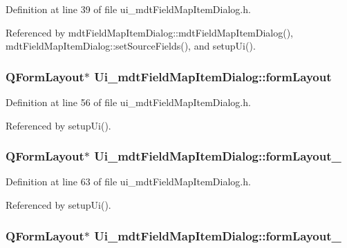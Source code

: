 Definition at line 39 of file ui\-\_\-mdt\-Field\-Map\-Item\-Dialog.\-h.



Referenced by mdt\-Field\-Map\-Item\-Dialog\-::mdt\-Field\-Map\-Item\-Dialog(), mdt\-Field\-Map\-Item\-Dialog\-::set\-Source\-Fields(), and setup\-Ui().

\hypertarget{class_ui__mdt_field_map_item_dialog_a70b660e5e042b03908d013fef4bb9437}{
\subsubsection[{form\-Layout}]{\setlength{\rightskip}{0pt plus 5cm}Q\-Form\-Layout$\ast$ Ui\-\_\-mdt\-Field\-Map\-Item\-Dialog\-::form\-Layout}}\label{class_ui__mdt_field_map_item_dialog_a70b660e5e042b03908d013fef4bb9437}


Definition at line 56 of file ui\-\_\-mdt\-Field\-Map\-Item\-Dialog.\-h.



Referenced by setup\-Ui().

\hypertarget{class_ui__mdt_field_map_item_dialog_a010f84c75b657df551a246d9578ce88a}{
\subsubsection[{form\-Layout\-\_\-2}]{\setlength{\rightskip}{0pt plus 5cm}Q\-Form\-Layout$\ast$ Ui\-\_\-mdt\-Field\-Map\-Item\-Dialog\-::form\-Layout\-\_}}\label{class_ui__mdt_field_map_item_dialog_a010f84c75b657df551a246d9578ce88a}


Definition at line 63 of file ui\-\_\-mdt\-Field\-Map\-Item\-Dialog.\-h.



Referenced by setup\-Ui().

\hypertarget{class_ui__mdt_field_map_item_dialog_aeed0e8395f5f21cc0fab26f375f01dc6}{
\subsubsection[{form\-Layout\-\_\-3}]{\setlength{\rightskip}{0pt plus 5cm}Q\-Form\-Layout$\ast$ Ui\-\_\-mdt\-Field\-Map\-Item\-Dialog\-::form\-Layout\-\_}}\label{class_ui__mdt_field_map_item_dialog_aeed0e8395f5f21cc0fab26f375f01dc6}


